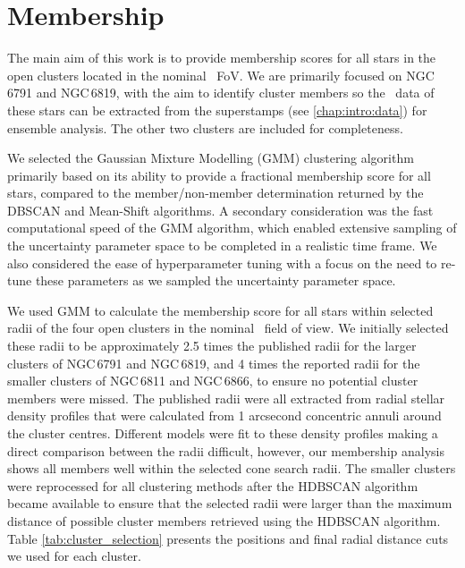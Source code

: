 
\section{Membership}

The main aim of this work is to provide membership scores for all stars in the open clusters located in the nominal \Kepler~FoV. We are primarily focused on NGC\,6791 and NGC\,6819, with the aim to identify cluster members so the \Kepler~data of these stars can be extracted from the superstamps (see \cref{chap:intro:data}) for ensemble analysis. The other two clusters are included for completeness.

We selected the Gaussian Mixture Modelling (GMM) clustering algorithm primarily based on its ability to provide a fractional membership score for all stars, compared to the member/non-member determination returned by the DBSCAN and Mean-Shift algorithms. A secondary consideration was the fast computational speed of the GMM algorithm, which enabled extensive sampling of the uncertainty parameter space to be completed in a realistic time frame. We also considered the ease of hyperparameter tuning with a focus on the need to re-tune these parameters as we sampled the uncertainty parameter space.

We used GMM to calculate the membership score for all stars within selected radii of the four open clusters in the nominal \Kepler~field of view. We initially selected these radii to be approximately 2.5 times the published radii for the larger clusters of NGC\,6791 and NGC\,6819, and 4 times the reported radii for the smaller clusters of NGC\,6811 and NGC\,6866, to ensure no potential cluster members were missed. The published radii were all extracted from radial stellar density profiles that were calculated from 1 arcsecond concentric annuli around the cluster centres. Different models were fit to these density profiles making a direct comparison between the radii difficult, however, our membership analysis shows all members well within the selected cone search radii. The smaller clusters were reprocessed for all clustering methods after the HDBSCAN algorithm became available to ensure that the selected radii were larger than the maximum distance of possible cluster members retrieved using the HDBSCAN algorithm. Table \ref{tab:cluster_selection} presents the positions and final radial distance cuts we used for each cluster.

